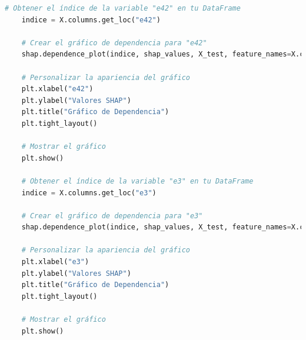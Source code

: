 \begin{lstlisting}[language=Python, caption=Grafico de dependencia e42 e3, label=lst:grafDepe42e3]
    # Obtener el índice de la variable "e42" en tu DataFrame
    indice = X.columns.get_loc("e42")
    
    # Crear el gráfico de dependencia para "e42"
    shap.dependence_plot(indice, shap_values, X_test, feature_names=X.columns, show=False)
    
    # Personalizar la apariencia del gráfico
    plt.xlabel("e42")
    plt.ylabel("Valores SHAP")
    plt.title("Gráfico de Dependencia")
    plt.tight_layout()
    
    # Mostrar el gráfico
    plt.show()

    # Obtener el índice de la variable "e3" en tu DataFrame
    indice = X.columns.get_loc("e3")
    
    # Crear el gráfico de dependencia para "e3"
    shap.dependence_plot(indice, shap_values, X_test, feature_names=X.columns, show=False)
    
    # Personalizar la apariencia del gráfico
    plt.xlabel("e3")
    plt.ylabel("Valores SHAP")
    plt.title("Gráfico de Dependencia")
    plt.tight_layout()
    
    # Mostrar el gráfico
    plt.show()
\end{lstlisting}

